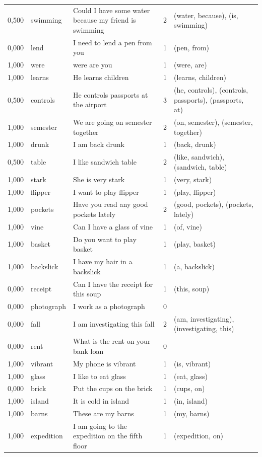 \documentclass[a4paper,12pt]{article}
\begin{document}
\begin{landscape}
\begin{longtable}{l l l r l}
0,500 & swimming & Could I have some water because my friend is swimming & 2 & (water, because), (is, swimming) \\
0,000 & lend & I need to lend a pen from you & 1 & (pen, from) \\
1,000 & were & were are you & 1 & (were, are) \\
1,000 & learns & He learns children & 1 & (learns, children) \\
0,500 & controls & He controls passports at the airport & 3 & (he, controls), (controls, passports), (passports, at) \\
1,000 & semester & We are going on semester together & 2 & (on, semester), (semester, together) \\
1,000 & drunk & I am back drunk & 1 & (back, drunk) \\
0,500 & table & I like sandwich table & 2 & (like, sandwich), (sandwich, table) \\
1,000 & stark & She is very stark & 1 & (very, stark) \\
1,000 & flipper & I want to play flipper & 1 & (play, flipper) \\
1,000 & pockets & Have you read any good pockets lately & 2 & (good, pockets), (pockets, lately) \\
1,000 & vine & Can I have a glass of vine & 1 & (of, vine) \\
1,000 & basket & Do you want to play basket & 1 & (play, basket) \\
1,000 & backslick & I have my hair in a backslick & 1 & (a, backslick) \\
0,000 & receipt & Can I have the receipt for this soup & 1 & (this, soup) \\
0,000 & photograph & I work as a photograph & 0 &  \\
0,000 & fall & I am investigating this fall & 2 & (am, investigating), (investigating, this) \\
0,000 & rent & What is the rent on your bank loan & 0 &  \\
1,000 & vibrant & My phone is vibrant & 1 & (is, vibrant) \\
1,000 & glass & I like to eat glass & 1 & (eat, glass) \\
0,000 & brick & Put the cups on the brick & 1 & (cups, on) \\
1,000 & island & It is cold in island & 1 & (in, island) \\
1,000 & barns & These are my barns & 1 & (my, barns) \\
1,000 & expedition & I am going to the expedition on the fifth floor & 1 & (expedition, on) \\

\end{longtable}
\end{landscape}
\end{document}
